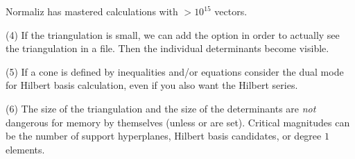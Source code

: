Normaliz has mastered calculations with $> 10^{15}$ vectors.

(4) If the triangulation is small, we can add the option
 in order to actually see the triangulation in a file.
Then the individual determinants become visible.

(5) If a cone is defined by inequalities and/or equations
consider the dual mode for Hilbert basis calculation, even if
you also want the Hilbert series.

(6) The size of the triangulation and the size of the
determinants are \emph{not} dangerous for memory by themselves
(unless  or  are set). Critical magnitudes can
be the number of support hyperplanes, Hilbert basis candidates,
or degree $1$ elements.
